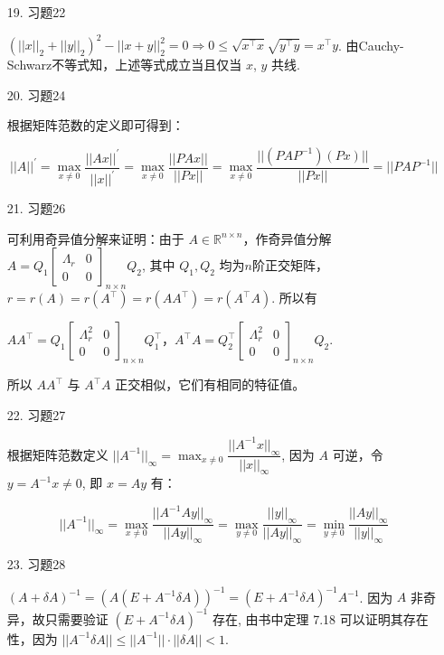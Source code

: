 \documentclass{article}
\begin{document}
\begin{itemize}
    \item [19.] 习题22
    
    $(||x||_2 + ||y||_2)^2 - ||x+y||_2^2 = 0 \Rightarrow 0 \leq \sqrt{x^\top x}\sqrt{y^\top y} = x^\top y$. 由Cauchy-Schwarz不等式知，上述等式成立当且仅当 $x$, $y$ 共线.

    \item [20.] 习题24
     
    根据矩阵范数的定义即可得到：

    $$||A||^\prime = \max_{x\ne 0} \dfrac{||Ax||^\prime}{||x||^\prime} = \max_{x\ne 0} \dfrac{||PAx||}{||Px||} = \max_{x\ne 0} \dfrac{||(PAP^{-1}) (Px)||}{||Px||} = ||PAP^{-1}||$$

    \item [21.] 习题26
    
    可利用奇异值分解来证明：由于 $A\in\mathbb{R}^{n\times n}$，作奇异值分解 $A = Q_1 \left[\begin{array}{cc}\Lambda_r&0\\0&0\end{array}\right]_{n\times n}Q_2$, 其中 $Q_1, Q_2$ 均为$n$阶正交矩阵， $r = r(A) = r(A^\top) = r(AA^\top) = r(A^\top A)$. 所以有 
    
    $AA^\top = Q_1\left[\begin{array}{cc}\Lambda_r^2&0\\0&0\end{array}\right]_{n\times n}Q_1^\top$，$A^\top A = Q_2^\top \left[\begin{array}{cc}\Lambda_r^2&0\\0&0\end{array}\right]_{n\times n}Q_2$.

    所以 $AA^\top$ 与 $A^\top A$ 正交相似，它们有相同的特征值。

    \item [22.] 习题27
    
    根据矩阵范数定义 $||A^{-1}||_\infty = \max_{x\ne 0} \dfrac{||A^{-1}x||_\infty}{||x||_\infty}$, 因为 $A$ 可逆，令 $y = A^{-1} x\ne 0$, 即 $x = Ay$ 有：

    $$||A^{-1}||_\infty = \max_{x\ne 0} \dfrac{||A^{-1}Ay||_\infty}{||Ay||_\infty} = \max_{y\ne 0} \dfrac{||y||_\infty}{||Ay||_\infty} = \min_{y\ne 0} \dfrac{||Ay||_\infty}{||y||_\infty}$$

    \item [23.] 习题28
    
    $(A + \delta A)^{-1} = \left(A (E + A^{-1}\delta A)\right)^{-1} = (E + A^{-1}\delta A)^{-1} A^{-1}$. 因为 $A$ 非奇异，故只需要验证 $(E + A^{-1}\delta A)^{-1}$ 存在, 由书中定理 7.18 可以证明其存在性，因为 $||A^{-1}\delta A|| \leq ||A^{-1}||\cdot ||\delta A|| < 1$.


\end{itemize}
\end{document}
